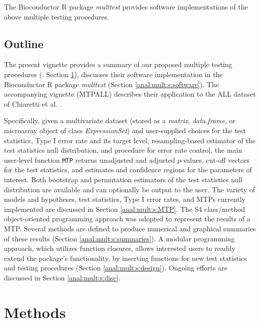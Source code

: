 \documentclass[11pt]{article}
\newcommand{\Rpackage}[1]{\textit{#1}}
\newcommand{\Robject}[1]{\texttt{#1}}
\newcommand{\Rclass}[1]{\textit{#1}}
\begin{document}
The Bioconductor R package \Rpackage{multtest} provides software implementations of the above multiple testing procedures. 

\subsection{Outline}

The present vignette provides a summary of our proposed multiple testing procedures (\cite{Dudoit&vdLaanMTBook,DudoitetalMT1SAGMB04,vdLaanetalMT2SAGMB04,vdLaanetalMT3SAGMB04,Pollard&vdLaanJSPI04}. Section \ref{anal:mult:s:methods}), 
discusses their software implementation in the Bioconductor R package \Rpackage{multtest} (Section \ref{anal:mult:s:software}). 
The accompanying vignette (MTPALL) describes their application to the ALL dataset of Chiaretti et al. \cite{Chiarettietal04}.

Specifically, given a multivariate dataset (stored as a \Rclass{matrix}, \Rclass{data.frame}, or microarray object of class \Rclass{ExpressionSet}) 
and user-supplied choices for the test statistics, Type I error rate and its target level, resampling-based estimator of the test statistics null distribution, and procedure for error rate control, the main user-level function \Robject{MTP} returns unadjusted and adjusted $p$-values, cut-off vectors for the test statistics, and estimates and confidence regions for the parameters of interest. 
Both bootstrap and permutation estimators of the test statistics null distribution are available and can optionally be output to the user. 
The variety of models and hypotheses, test statistics, Type I error rates, and MTPs currently implemented are discussed in Section \ref{anal:mult:s:MTP}.
The S4 class/method object-oriented programming approach was adopted to represent the results of a MTP. 
Several methods are defined to produce numerical and graphical summaries of these results (Section \ref{anal:mult:s:summaries}).
A modular programming approach, which utilizes function closures, allows interested users to readily extend the package's functionality, 
by inserting functions for new test statistics and testing procedures (Section \ref{anal:mult:s:design}).
Ongoing efforts are discussed in Section \ref{anal:mult:s:disc}.

\section{Methods}
\label{anal:mult:s:methods}
\end{document}
